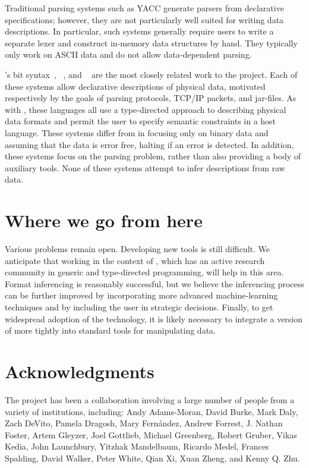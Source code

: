 \documentclass{sig-alternate}
\begin{document}
Traditional parsing systems such as \textsc{YACC} generate parsers from
declarative specifications; however, they are not particularly well
suited for writing data descriptions.  In particular, such systems
generally require users to write a separate lexer and construct
in-memory data structures by hand.  They typically only work on ASCII
data and do not allow data-dependent parsing.

\erlang{}'s bit syntax~\cite{erlang}, \packettypes{}~\cite{sigcomm00},
and \datascript{}~\cite{gpce02} are the most closely related work to
the \pads{} project.  Each of these systems allow declarative
descriptions of physical data, motivated respectively by the goals of
parsing protocols, \textsc{TCP/IP} packets, and \java{} jar-files.  As
with \pads{}, these languages all use a type-directed approach to
describing physical data formats and permit the user to specify
semantic constraints in a host language.  These systems differ from
\pads{} in focusing only on binary data and assuming that the data is
error free, halting if an error is detected.  In addition, these
systems focus on the parsing problem, rather than also providing a
body of auxiliary tools.  None of these systems attempt to infer
descriptions from raw data. 



\section{Where we go from here}
\label{sec:conclusion}
Various problems remain open.  
Developing new tools is still difficult.  We anticipate that working
in the context of \haskell{}, which has an active research community
in generic and type-directed programming, will help in this area.  
Format inferencing is reasonably successful, but we believe the
inferencing process can be further improved by incorporating more
advanced machine-learning techniques and by including the user in
strategic decisions.  Finally, to get widespread adoption of the
technology, it is likely necessary to integrate a version of \pads{}
more tightly into standard tools for manipulating data. 

  

\section*{Acknowledgments}
The \pads{} project has been a collaboration involving a large number of
people from a variety of institutions, including:
Andy Adams-Moran,
David Burke,
Mark Daly,
Zach DeVito,
Pamela Dragosh,
Mary Fern\'andez,
Andrew Forrest,
J. Nathan Foster,
Artem Gleyzer,
Joel Gottlieb,
Michael Greenberg,
Robert Gruber,
Vikas Kedia,
John Launchbury,
Yitzhak Mandelbaum,
Ricardo Medel,
Frances Spalding,
David Walker,
Peter White,
Qian Xi,
Xuan Zheng, and
Kenny Q. Zhu.
\end{document}
